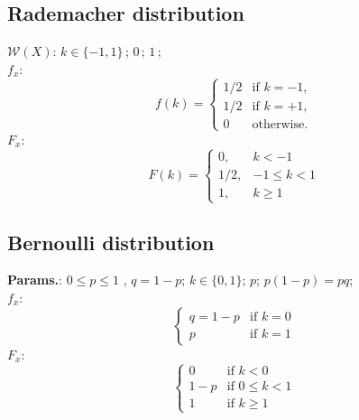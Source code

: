     
        
\subsection{Rademacher distribution}





    {\color{darkblue} \textbf{$\mathcal{W}(X)$}:} {$k \in \{-1,1\}\,$}; {$0\,$}; {$1\,$};\hspace{0.5cm}\\{\color{darkblue} \textbf{$f_x$}:} {$$f(k) = \left\{\begin{matrix} 1/2 & \mbox {if }k=-1, \\
1/2 & \mbox {if }k=+1, \\
0 & \mbox {otherwise.}\end{matrix}\right.$$}{\color{darkblue} \textbf{$F_x$}:} {$$F(k) = 
    \begin{cases}
     0,   & k < -1 \\
     1/2, & -1 \leq k < 1 \\
     1,   & k \geq 1
    \end{cases}$$}



    
        
\subsection{Bernoulli distribution}





    {\color{darkblue} \textbf{Params.}:} {$0 \leq p \leq 1$ ,  $q = 1 - p$}; {$k \in \{0,1\}$}; {$ p$}; {$p(1-p) = pq $};\hspace{0.5cm}\\{\color{darkblue} \textbf{$f_x$}:} {$$\begin{cases}
    q=1-p & \text{if }k=0 \\
    p & \text{if }k=1
    \end{cases}$$}{\color{darkblue} \textbf{$F_x$}:} {$$\begin{cases}
    0 & \text{if } k < 0 \\
    1 - p & \text{if } 0 \leq k < 1 \\
    1 & \text{if } k \geq 1
    \end{cases}$$}



